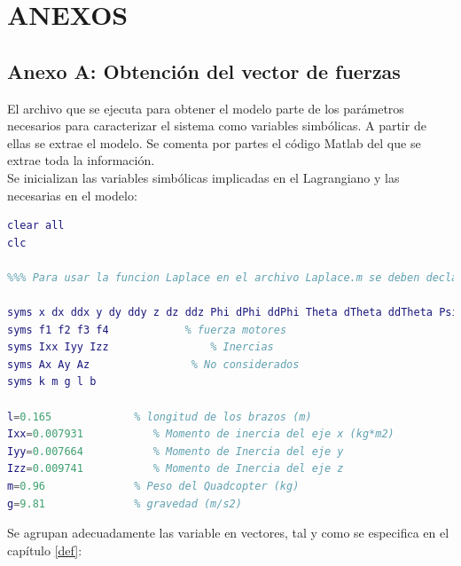 \documentclass[twoside,11pt]{book}
\begin{document}
\newpage

\chapter*{ANEXOS}
\section*{Anexo A: Obtención del vector de fuerzas}

El archivo que se ejecuta para obtener el modelo parte de los parámetros necesarios para caracterizar el sistema como variables simbólicas. A partir de ellas se extrae el modelo. Se comenta por partes el código Matlab del que se extrae toda la información. \\

Se inicializan las variables simbólicas implicadas en el Lagrangiano y las necesarias en el modelo:

\singlespacing
\begin{lstlisting}[language=Matlab]
clear all
clc

%%% Para usar la funcion Laplace en el archivo Laplace.m se deben declarar las variables de esta manera:

syms x dx ddx y dy ddy z dz ddz Phi dPhi ddPhi Theta dTheta ddTheta Psi dPsi ddPsi
syms f1 f2 f3 f4 		    % fuerza motores
syms Ixx Iyy Izz				% Inercias
syms Ax Ay Az                % No considerados
syms k m g l b

l=0.165             % longitud de los brazos (m)
Ixx=0.007931           % Momento de inercia del eje x (kg*m2) 
Iyy=0.007664           % Momento de Inercia del eje y
Izz=0.009741           % Momento de Inercia del eje z
m=0.96              % Peso del Quadcopter (kg)
g=9.81              % gravedad (m/s2)
\end{lstlisting}

Se agrupan adecuadamente las variable en vectores, tal y como se especifica en el capítulo \ref{def}:
\end{document}
